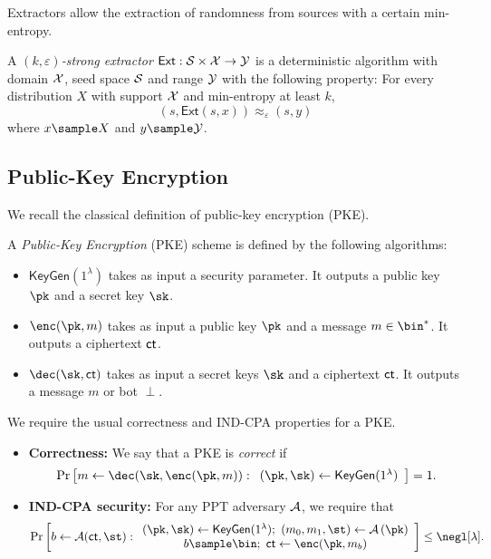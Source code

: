 Extractors allow the extraction of randomness from sources with a certain min-entropy.

\begin{definition}
A \emph{$(k,\varepsilon)$-strong extractor} $\mathsf{Ext}:\mathcal{S}\times \mathcal{X}\to \mathcal{Y}$ is a deterministic algorithm with domain $\mathcal{X}$, seed space $\mathcal{S}$ and range $\mathcal{Y}$ with the following property: For every distribution $X$ with support $\mathcal{X}$ and min-entropy at least $k$, $$(s,\mathsf{Ext}(s,x))\approx_\varepsilon (s,y)$$ where $x\sample X$ and $y\sample \Yc$.
\end{definition}

\subsection{Public-Key Encryption}
We recall the classical definition of public-key encryption (PKE).

\begin{definition}
A \emph{Public-Key Encryption} (PKE) scheme is defined by the following algorithms:
\begin{itemize}
    \item $ \mathsf{KeyGen}(1^\lambda)$ takes as input a security parameter. It outputs a public key $\pk$ and a secret key $\sk$.
    \item $\enc(\pk,m)$ takes as input a public key $\pk$ and a message $m\in\bin^*$. It outputs a ciphertext $\mathsf{ct}$.
    \item $ \dec(\sk,\ct)$ takes as input a secret keys $\sk$ and a ciphertext $\mathsf{ct}$. It outputs a message $m$ or bot $\perp$.
\end{itemize}{}
We require the usual correctness and IND-CPA properties for a PKE.

\begin{itemize}
    \item \textbf{Correctness:} We say that a PKE is \emph{correct} if $$\Pr\left[m\leftarrow\dec(\sk,\enc(\pk,m) ):\begin{array}{c}
     (\pk,\sk)\leftarrow\mathsf{KeyGen}(1^\lambda)
\end{array}\right]=1.$$
\item \textbf{IND-CPA security:} For  any PPT adversary $\mathcal{A}$, we require that $$\Pr\left[b\leftarrow\Ac(\ct,\st):\begin{array}{c}
     (\pk,\sk)\leftarrow\mathsf{KeyGen}(1^\lambda)  ; \text{ }
     (m_0,m_1,\st)\leftarrow\Ac\left(\pk \right) \\ 
     b\sample \bin  ; \text{ }
     \ct\leftarrow\enc(\pk,m_b)
\end{array}{}\right]\leq \negl[\lambda].$$
\end{itemize}
\end{definition}


